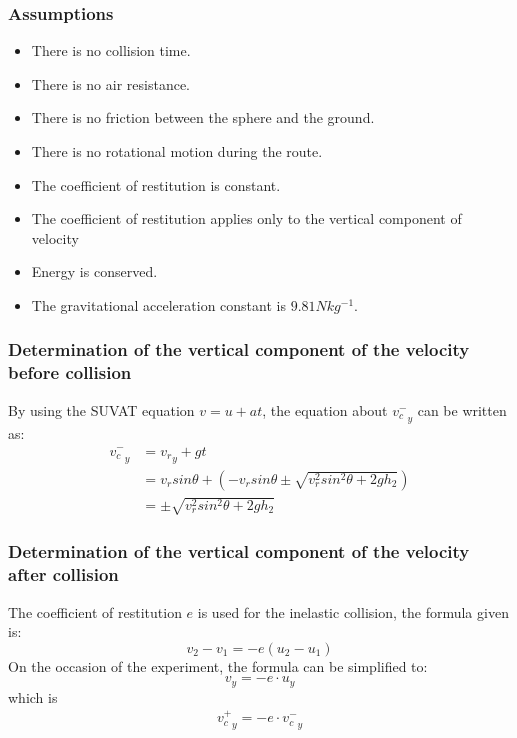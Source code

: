 \documentclass{article}
\begin{document}
        \subsubsection{Assumptions}
            \begin{itemize}
                \item There is no collision time.
                \item There is no air resistance.
                \item There is no friction between the sphere and the ground.
                \item There is no rotational motion during the route.
                \item The coefficient of restitution is constant.
                \item The coefficient of restitution applies only to the vertical component of velocity
                \item Energy is conserved.
                \item The gravitational acceleration constant is $9.81Nkg^{-1}$.
            \end{itemize}
        \subsubsection{Determination of the vertical component of the velocity before collision}
            By using the SUVAT equation $v = u + at$, the equation about ${v^-_c}_y$ can be written as:
            \begin{equation}
                \begin{aligned}
                    {v^-_c}_y &= {v_r}_y + gt\\
                    &= v_rsin\theta + (-v_{r}sin\theta\pm\sqrt{{v^2_{r}sin^2\theta}+2gh_2}) \\
                    &= \pm\sqrt{{v^2_{r}sin^2\theta}+2gh_2}
                \end{aligned}
            \end{equation}
        \subsubsection{Determination of the vertical component of the velocity after collision}
            The coefficient of restitution $e$ is used for the inelastic collision, the formula given is:
            \begin{equation}
                v_2 - v_1 = -e(u_2-u_1) \nonumber
            \end{equation}
            On the occasion of the experiment, the formula can be simplified to:
            \begin{equation} 
                v_y = -e\cdot u_y \nonumber
            \end{equation}
            which is 
            \begin{equation}
                \begin{aligned}
                    {v^+_c}_y = -e\cdot {v^-_c}_y
                \end{aligned}  
            \end{equation}
\end{document}
